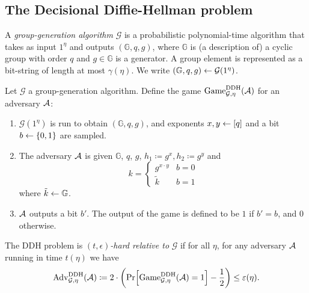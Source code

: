 \subsection{The Decisional Diffie-Hellman problem}

\begin{definition}
	A \emph{group-generation algorithm} $\mathcal{G}$ is a probabilistic polynomial-time algorithm that takes as input $1^\eta$ and outputs $(\mathbb{G}, q, g)$, where $\mathbb{G}$ is (a description of) a cyclic group with order $q$ and $g \in \mathbb{G}$ is a generator. A group element is represented as a bit-string of length at most $\gamma(\eta)$. We write $(\mathbb{G}, q, g) \leftarrow \mathcal{G}(1^\eta)$.
\end{definition}

\begin{definition}
	Let $\mathcal{G}$ a group-generation algorithm.
	Define the game $\mathrm{Game}_{\mathcal{G}, \eta}^{\mathrm{DDH}}(\mathcal{A})$ for an adversary $\mathcal{A}$:
	\begin{enumerate}[1.]
		\item $\mathcal{G}(1^\eta)$ is run to obtain $(\mathbb{G}, q, g)$, and exponents $x, y \leftarrow [q]$ and a bit $b \leftarrow \{0, 1\}$ are sampled.
		\item The adversary $\mathcal{A}$ is given $\mathbb{G}$, $q$, $g$, $h_1 \coloneqq g^x, h_2 \coloneqq g^y$ and
		      \[
			      k = \begin{cases}
				      g^{x \cdot y} & b = 0 \\
				      \tilde{k}     & b = 1
			      \end{cases}
		      \]
		      where $\tilde{k} \leftarrow \mathbb{G}$.
		\item $\mathcal{A}$ outputs a bit $b'$. The output of the game is defined to be $1$ if $b' = b$, and $0$ otherwise.
	\end{enumerate}
\end{definition}

\begin{definition}
	The DDH problem is \emph{$(t, \epsilon)$-hard relative to} $\mathcal{G}$ if for all $\eta$, for any adversary $\mathcal{A}$ running in time $t(\eta)$ we have
	\begin{align*}
		\advantage{\mathcal{G}}{\eta}{DDH}(\adv) \coloneqq 2 \cdot \left(\pr{\game{\mathcal{G}}{\eta}{DDH}(\adv) = 1} - \frac{1}{2}\right) \le \epsilon(\eta).
	\end{align*}
\end{definition}

